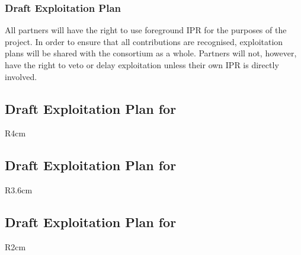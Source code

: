 \documentclass[a4paper,11pt]{article}
\begin{document}
\subsubsection{Draft Exploitation Plan}
\label{sect:exploitation-plan}
\vspace{-12pt}

All partners will have the right to use foreground IPR for
the purposes of the project. In order to ensure that all
contributions are recognised, exploitation plans will be
shared with the consortium as a whole. Partners will not,
however, have the right to veto or delay exploitation
unless their own IPR is directly involved.


\horizontalline

\subsection*{Draft Exploitation Plan for \IBMshort{}}


\begin{wrapfigure}{R}{4cm}
\vspace{-1.4cm}
\hfill {}
\vspace{-0.6cm}
\end{wrapfigure}

\horizontalline

\subsection*{Draft Exploitation Plan for \SCCHshort{}}
\vspace{-6pt}

\begin{wrapfigure}{R}{3.6cm}
\vspace{-1.3cm}
\hfill {}
\vspace{-0.8cm}
\end{wrapfigure}

\horizontalline

\subsection*{Draft Exploitation Plan for \SAshort{}}

\begin{wrapfigure}{R}{2cm}
\vspace{-1.4cm}
\hfill {}
\vspace{-0.9cm}
\end{wrapfigure}
\end{document}
